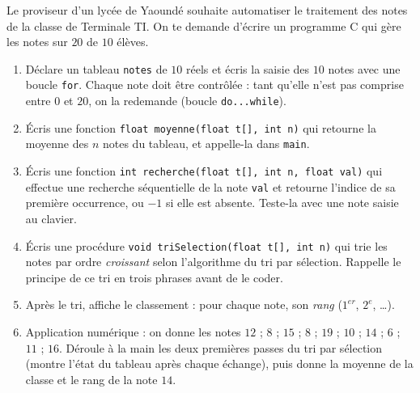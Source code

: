 \documentclass[11pt]{article}
\newcommand{\cle}[1]{{\popxbold\color{popdark}#1}}
\newcounter{popsec}
\newcounter{popsub}
\newcommand{\courssub}[1]{%
  \stepcounter{popsub}%
  \par\vspace{9pt}\noindent{\popxbold\fontsize{11.5}{13}\selectfont\color{popink}{\color{poporange}\thepopsec.\thepopsub}\hspace{6pt}#1}\par\nopagebreak\vspace{4pt}
}
\begin{document}
\courssub{Je me prépare au Bac}

\begin{exercice}
Le proviseur d'un lycée de Yaoundé souhaite automatiser le traitement des notes de la classe de Terminale TI. On te demande d'écrire un programme C qui gère les notes sur $20$ de $10$ élèves.
\begin{enumerate}
\item Déclare un tableau \texttt{notes} de $10$ réels et écris la saisie des $10$ notes avec une boucle \texttt{for}. Chaque note doit être contrôlée : tant qu'elle n'est pas comprise entre $0$ et $20$, on la redemande (boucle \texttt{do...while}).
\item Écris une fonction \texttt{float moyenne(float t[], int n)} qui retourne la moyenne des $n$ notes du tableau, et appelle-la dans \texttt{main}.
\item Écris une fonction \texttt{int recherche(float t[], int n, float val)} qui effectue une \cle{recherche séquentielle} de la note \texttt{val} et retourne l'indice de sa première occurrence, ou $-1$ si elle est absente. Teste-la avec une note saisie au clavier.
\item Écris une procédure \texttt{void triSelection(float t[], int n)} qui trie les notes par ordre \emph{croissant} selon l'algorithme du \cle{tri par sélection}. Rappelle le principe de ce tri en trois phrases avant de le coder.
\item Après le tri, affiche le classement : pour chaque note, son \emph{rang} ($1^{er}$, $2^e$, \dots).
\item Application numérique : on donne les notes $12$ ; $8$ ; $15$ ; $8$ ; $19$ ; $10$ ; $14$ ; $6$ ; $11$ ; $16$. Déroule à la main les deux premières passes du tri par sélection (montre l'état du tableau après chaque échange), puis donne la moyenne de la classe et le rang de la note $14$.
\end{enumerate}
\end{exercice}
\end{document}
